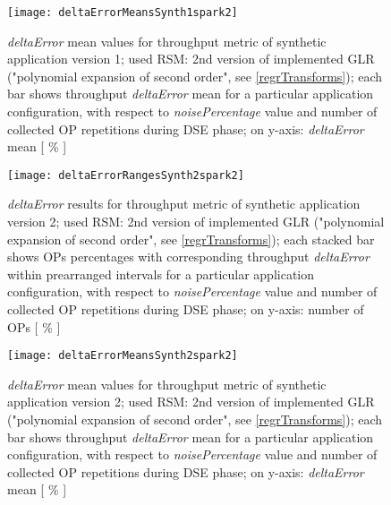 \begin{figure}[H]

    \centering
    
    \texttt{[image: deltaErrorMeansSynth1spark2]}
    
    \caption{\textit{deltaError} mean values for throughput metric of synthetic application version 1; used RSM: 2nd version of implemented GLR ("polynomial expansion of second order", see \ref{regrTransforms}); each bar shows throughput \textit{deltaError} mean for a particular application configuration, with respect to \textit{noisePercentage} value and number of collected OP repetitions during DSE phase; on y-axis: \textit{deltaError} mean [ \% ]}
    
    \label{fig::synth1spark2::means}
    
\end{figure}





\begin{figure}[H]

    \centering
    
    \texttt{[image: deltaErrorRangesSynth2spark2]}
    
     \caption{\textit{deltaError} results for throughput metric of synthetic application version 2; used RSM: 2nd version of implemented GLR ("polynomial expansion of second order", see \ref{regrTransforms}); each stacked bar shows OPs percentages with corresponding throughput \textit{deltaError} within prearranged intervals for a particular application configuration, with respect to \textit{noisePercentage} value and number of collected OP repetitions during DSE phase; on y-axis: number of OPs [ \% ]}
    
    \label{fig::synth2spark2::intervals}
    
\end{figure}

\begin{figure}[H]

    \centering
    
    \texttt{[image: deltaErrorMeansSynth2spark2]}
    
    \caption{\textit{deltaError} mean values for throughput metric of synthetic application version 2; used RSM: 2nd version of implemented GLR ("polynomial expansion of second order", see \ref{regrTransforms}); each bar shows throughput \textit{deltaError} mean for a particular application configuration, with respect to \textit{noisePercentage} value and number of collected OP repetitions during DSE phase; on y-axis: \textit{deltaError} mean [ \% ]}
    
    \label{fig::synth2spark2::means}
    
\end{figure}





